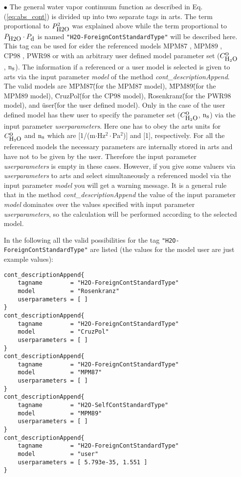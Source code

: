 {\begin{itemize}
\item[$\bullet$] The general water vapor continuum function
as described in Eq. (\ref{eq:abs_cont}) is divided up into 
two separate tags in arts. The term proportional 
to $P_{\mbox{\rm \small H2O}}^2$ was explained above while the term proportional 
to $P_{\mbox{\rm \small H2O}} \cdot P_{\mbox{\rm \small d}}$ is named {\tt "H2O-ForeignContStandardType"}
will be described here.
This tag can be used for eider the referenced models 
MPM87 \citep{liebeandlayton:87}, MPM89 \citep{liebe:89}, 
CP98 \citep{cruzpol:98}, PWR98 \citep{pwr:98} or with
an arbitrary user defined model parameter set ($C^{\mbox{\rm o}}_{\mbox{\rm \small H}_{2}\mbox{\rm \small O}}$, ${\rm n}_{\mbox{\rm \small s}}$).
The information if a referenced or a user model is selected 
is given to arts via the input parameter {\it model} of the 
method {\it cont\_descriptionAppend}. The valid models are
\"MPM87\" (for the MPM87 model), \"MPM89\" (for the MPM89 model), 
\"CruzPol\" (for the CP98 model), \"Rosenkranz\" (for the PWR98 model), 
and \"user\"  (for the user defined model). Only in the case 
of the user defined model has thew user to specify the 
parameter set ($C^{\mbox{\rm o}}_{\mbox{\rm \small H}_{2}\mbox{\rm \small O}}$, ${\rm n}_{\mbox{\rm \small s}}$) via the input parameter 
{\it userparameters}. Here one has to obey the arts units for 
$C^{\mbox{\rm o}}_{\mbox{\rm \small H}_{2}\mbox{\rm \small O}}$ and ${\rm n}_{\mbox{\rm \small s}}$ which are $[$1/(m$\cdot$Hz$^2\cdot$Pa$^2$)$]$ and 
$[$1$]$, respectively. For all the referenced models the necessary
parameters are internally stored in arts and have not to be given by
the user. Therefore the input parameter {\it userparameters} is empty
in these cases. However, if you give some valuers via 
{\it userparameters} to arts and select simultaneously a 
referenced model via the input parameter {\it model} you will get 
a warning message. It is a general rule that in the method 
{\it cont\_descriptionAppend} the value of the input 
parameter {\it model} dominates over the values specified with 
input parameter {\it userparameters}, so the calculation will be
performed according to the selected model.

In the following all the valid possibilities for the
tag {\tt "H2O-ForeignContStandardType"} are listed (the values for the 
model user are just example values): 
\begin{verbatim}
cont_descriptionAppend{
    tagname        = "H2O-ForeignContStandardType"
    model          = "Rosenkranz"
    userparameters = [ ]
}
cont_descriptionAppend{
    tagname        = "H2O-ForeignContStandardType"
    model          = "CruzPol"
    userparameters = [ ]
}
cont_descriptionAppend{
    tagname        = "H2O-ForeignContStandardType"
    model          = "MPM87"
    userparameters = [ ]
}
cont_descriptionAppend{
    tagname        = "H2O-SelfContStandardType"
    model          = "MPM89"
    userparameters = [ ]
}
cont_descriptionAppend{
    tagname        = "H2O-ForeignContStandardType"
    model          = "user"
    userparameters = [ 5.793e-35, 1.551 ]
}
\end{verbatim}



\end{itemize}}
